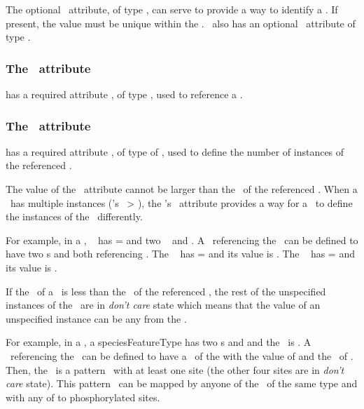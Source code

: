 The optional \idAtt\ attribute, of type \SIdPT, can serve to provide a way to identify a \speciesFeature. If present, the value must be unique within the \species. \SpeciesFeature\ also has an optional \nameAtt\ attribute of type \stringPT.

\subsubsection{The \speciesFeatureTypeAtt\ attribute}
\label{def:SpeciesFeature:speciesFeatureType}

 has a required attribute \speciesFeatureTypeAtt, of type \SIdRefPT, used to reference a .

\subsubsection{The \occurAtt\ attribute}
\label{def:SpeciesFeature:occur}

 has a required attribute \occurAtt, of type of \positiveIntegerPT, used to define the number of instances of the referenced \speciesFeatureType. 

The value of the \occurAtt\ attribute cannot be larger than the \occurAtt\ of the referenced \speciesFeatureType. When a \speciesFeatureType\ has multiple instances (\speciesFeatureType's \occurAtt\ > ), the \speciesFeature's \occurAtt\ attribute provides a way for a \species\ to define the instances of the \speciesFeatureType\ differently. 

For example, in a \speciesType, \speciesFeatureType\  has \occurAtt= and two \possibleSpeciesFeatureValues\  and . A \species\ referencing the \speciesType\ can be defined to have two \speciesFeature s  and  both referencing . The \speciesFeature\  has \occurAtt= and its value is . The \speciesFeature\  has \occurAtt= and its value is .

If the \occurAtt\ of a \speciesFeature\ is less than the \occurAtt\ of the referenced \speciesFeatureType, the rest of the unspecified instances of the \speciesFeatureType\ are in \emph{don't care} state which means that the value of an unspecified instance can be any from the \listOfPossibleSpeciesFeatureValues. 

For example, in a \speciesType, a speciesFeatureType  has two \possibleSpeciesFeatureValue s  and  and the \occurAtt\ is . A \species\ referencing the \speciesType\ can be defined to have a \speciesFeature\ of the  with the value of  and the \occurAtt\ of . Then, the \species\ is a pattern \species\ with at least one  site (the other four  sites are in \emph{don't care} state). This pattern \species\ can be mapped by anyone of the \fullydefinedspeciesWC\ of the same type and with any of  to  phosphorylated sites. 

